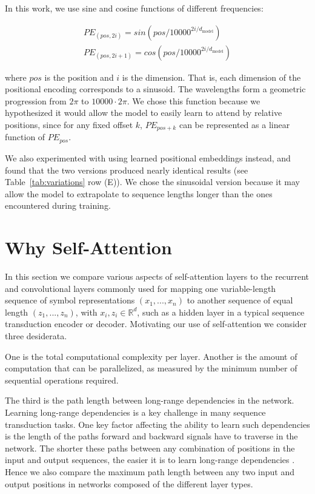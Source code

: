 \documentclass{article}
\newcommand{\dmodel}{d_{\text{model}}}
\begin{document}
In this work, we use sine and cosine functions of different frequencies:

\begin{align*}
    PE_{(pos,2i)} = sin(pos / 10000^{2i/\dmodel}) \\
    PE_{(pos,2i+1)} = cos(pos / 10000^{2i/\dmodel})
\end{align*}

where $pos$ is the position and $i$ is the dimension.  That is, each dimension of the positional encoding corresponds to a sinusoid.  The wavelengths form a geometric progression from $2\pi$ to $10000 \cdot 2\pi$.  We chose this function because we hypothesized it would allow the model to easily learn to attend by relative positions, since for any fixed offset $k$, $PE_{pos+k}$ can be represented as a linear function of $PE_{pos}$.

We also experimented with using learned positional embeddings \citep{JonasFaceNet2017} instead, and found that the two versions produced nearly identical results (see Table~\ref{tab:variations} row (E)).  We chose the sinusoidal version because it may allow the model to extrapolate to sequence lengths longer than the ones encountered during training.
 
\section{Why Self-Attention}


In this section we compare various aspects of self-attention layers to the recurrent and convolutional layers commonly used for mapping one variable-length sequence of symbol representations $(x_1, ..., x_n)$ to another sequence of equal length $(z_1, ..., z_n)$, with $x_i, z_i \in \mathbb{R}^d$, such as a hidden layer in a typical sequence transduction encoder or decoder. Motivating our use of self-attention we consider three desiderata.

One is the total computational complexity per layer.
Another is the amount of computation that can be parallelized, as measured by the minimum number of sequential operations required.

The third is the path length between long-range dependencies in the network. Learning long-range dependencies is a key challenge in many sequence transduction tasks. One key factor affecting the ability to learn such dependencies is the length of the paths forward and backward signals have to traverse in the network. The shorter these paths between any combination of positions in the input and output sequences, the easier it is to learn long-range dependencies \citep{hochreiter2001gradient}. Hence we also compare the maximum path length between any two input and output positions in networks composed of the different layer types.
\end{document}
